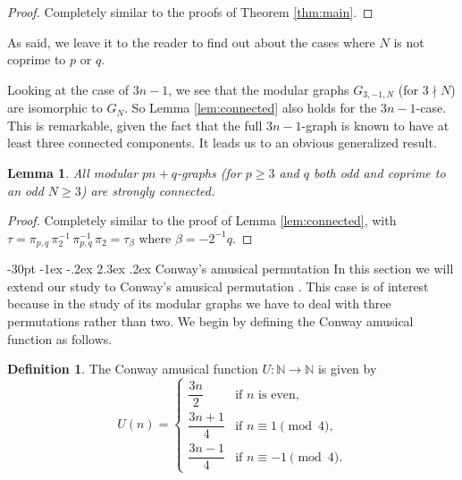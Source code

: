 \documentclass[10pt]{article}
\makeatletter
\renewcommand\section{\@startsection {section}{1}{\z@}
{-30pt \@plus -1ex \@minus -.2ex}
{2.3ex \@plus.2ex}
{\normalfont\normalsize\bfseries\boldmath}}
\newtheorem{lemma}{Lemma}
\theoremstyle{definition}
\newtheorem{definition}{Definition}
\newcommand{\N}{\mathbb{N}}
\makeatother
\begin{document}
\begin{proof}
    Completely similar to the proofs of Theorem \ref{thm:main}.
\end{proof}

As said, we leave it to the reader to find out about the cases where $ N $ is not coprime to $ p $ or
$ q $.

Looking at the case of $ 3 n - 1 $, we see that the modular graphs $ G_{3,-1,N} $ (for $ 3 \nmid N $)
are isomorphic to $ G_N $. So Lemma \ref{lem:connected} also holds for the $ 3 n - 1 $-case.
This is remarkable, given the fact that the full $ 3 n - 1 $-graph is known to have at least three
connected components. It leads us to an obvious generalized result.

\begin{lemma} \label{lem:connectedpn+q}
    All modular $ p n + q $-graphs (for $ p \geq 3 $ and $ q $ both odd and coprime to an odd $ N \geq 3 $)
    are strongly connected.
\end{lemma}

\begin{proof}
    Completely similar to the proof of Lemma \ref{lem:connected}, with
    $ \tau = \pi_{p,q} \, \pi_2^{-1} \, \pi_{p,q}^{-1} \, \pi_2 = \tau_{\beta} $ where $ \beta = - 2^{-1} q $.
\end{proof}

\section{Conway's amusical permutation}
In this section we will extend our study to Conway's amusical permutation \cite{C}. This case is of interest
because in the study of its modular graphs we have to deal with three permutations rather than two. We begin
by defining the Conway amusical function as follows.

\begin{definition}
    The Conway amusical function $ U : \N \to \N $ is given by
    \begin{equation}
        U(n) = \begin{cases}
            \dfrac{3n}{2}   & \text{if } n \text{ is even}, \\[8pt]
            \dfrac{3n+1}{4} & \text{if } n \equiv  1 \pmod{4}, \\[8pt]
            \dfrac{3n-1}{4} & \text{if } n \equiv -1 \pmod{4}.
        \end{cases}
    \end{equation}
\end{definition}
\end{document}
